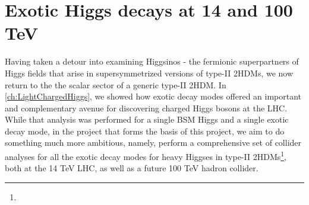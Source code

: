 \chapter{Exotic Higgs decays at 14 and 100 TeV}\label{ch:ExoticHiggs}

Having taken a detour into examining Higgsinos - the fermionic superpartners of Higgs fields that arise in supersymmetrized versions of type-II 2HDMs, we now return to the the scalar sector of a generic type-II 2HDM. In \autoref{ch:LightChargedHiggs}, we showed how exotic decay modes offered an important and complementary avenue for discovering charged Higgs bosons at the LHC. While that analysis was performed for a single BSM Higgs and a single exotic decay mode, in the project that forms the basis of this project, we aim to do something much more ambitious, namely, perform a comprehensive set of collider analyses for all the exotic decay modes for heavy Higgses in type-II 2HDMs\footnote{}, both at the 14 TeV LHC, as well as a future 100 TeV hadron collider.

